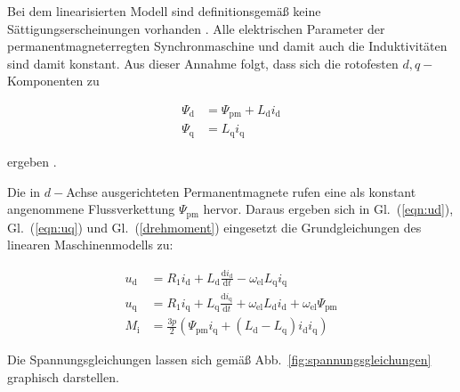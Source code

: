 \documentclass[conference,twocolumn]{IEEEtran}
\newcommand{\x}[1]{\mathrm{#1}}
\begin{document}
Bei dem linearisierten Modell sind definitionsgemäß keine Sättigungserscheinungen vorhanden \autocite{mullerII2008}.
Alle elektrischen Parameter der permanentmagneterregten Synchronmaschine und damit auch die Induktivitäten sind damit konstant.
Aus dieser Annahme folgt, dass sich die rotofesten $d, q-$Komponenten zu

\begin{align}
\Psi_\x{d} &= \Psi_\x{pm} + L_\x{d} i_\x{d} \label{eqn:psid}\\
\Psi_\x{q} &= L_\x{q} i_\x{q} \label{eqn:psiq}
\end{align}

ergeben \autocite{schroder2001}.

Die in $d-$Achse ausgerichteten Permanentmagnete rufen eine als konstant angenommene Flussverkettung $\Psi_\x{pm}$ hervor.
Daraus ergeben sich in Gl.~(\ref{eqn:ud}), Gl.~(\ref{eqn:uq}) und Gl.~(\ref{drehmoment}) eingesetzt die Grundgleichungen des linearen Maschinenmodells zu:

\begin{align}
u_\x{d} &= R_\x{1} i_\x{d} + L_\x{d} \frac{\x{d}i_\x{d}}{\x{d}t} - \omega_\x{el}L_\x{q} i_\x{q}  \label{uq-allg} \\ 
u_\x{q} &= R_\x{1} i_\x{q} + L_\x{q} \frac{\x{d}i_\x{q}}{\x{d}t} + \omega_\x{el}L_\x{d} i_\x{d} + \omega_\x{el}\Psi_\x{pm} \label{ud-allg} \\ 
M_\x{i} &= \frac{3p}{2}(\Psi_\x{pm} i_\x{q} + (L_\x{d} - L_\x{q})i_\x{d} i_\x{q})
\end{align}

Die Spannungsgleichungen lassen sich gemäß Abb.~\ref{fig:spannungsgleichungen} graphisch darstellen.
\end{document}
